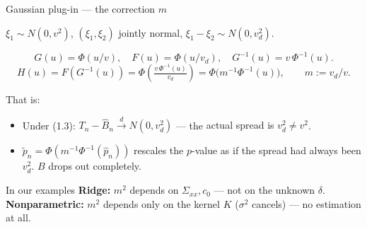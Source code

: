 \documentclass[10pt,aspectratio=169]{beamer}
\theoremstyle{plain}
\newcommand{\dto}{\xrightarrow{d}}
\newcommand{\Tn}{T_{n}}
\newcommand{\Bnh}{\hat{B}_{n}}
\newcommand{\pnh}{\hat{p}_{n}}
\newcommand{\pnt}{\tilde{p}_{n}}
\begin{document}
\begin{frame}{Gaussian plug-in --- the correction $m$}

  $\xi_1 \sim N(0,v^2)$, $(\xi_1,\xi_2)$ jointly normal, $\xi_1-\xi_2 \sim N(0,v_d^2)$.
  
    \medskip

  \[
    G(u) = \Phi(u/v),\quad F(u) = \Phi(u/v_d),\quad G^{-1}(u) = v\,\Phi^{-1}(u).
  \]
  \[
    H(u) = F(G^{-1}(u))
         = \Phi\!\left(\tfrac{v\,\Phi^{-1}(u)}{v_d}\right)
         = \Phi\!\bigl(m^{-1}\Phi^{-1}(u)\bigr),
    \qquad m := v_d/v.
  \]

  \medskip
  That is:
  \begin{itemize}
    \setlength{\itemsep}{6pt}
    \item Under (1.3): $\Tn - \Bnh \dto N(0,v_d^2)$ --- the
      \alert{actual spread is $v_d^2 \neq v^2$}.
    \item $\pnt = \Phi(m^{-1}\Phi^{-1}(\pnh))$ rescales the $p$-value as if
      the spread had always been $v_d^2$. \alert{$B$ drops out completely.}
  \end{itemize}

  \medskip

  \begin{block}{In our examples}
    \footnotesize
    \textbf{Ridge:} $m^2$ depends on $\Sigma_{xx}, c_0$ ---
    \alert{not} on the unknown $\delta$.\\
    \textbf{Nonparametric:} $m^2$ depends \alert{only on the kernel $K$}
    ($\sigma^2$ cancels) --- no estimation at all.
  \end{block}

\end{frame}

\end{document}
